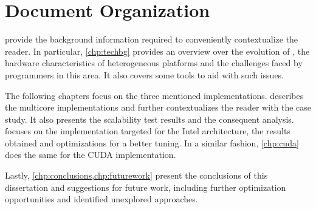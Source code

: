 \documentclass[../thesis]{subfiles}
\begin{document}
	\section{Document Organization}
	 provide the background information required to conveniently contextualize the reader. In particular, \cref{chp:techbg} provides an overview over the evolution of \hpc, the hardware characteristics of heterogeneous platforms and the challenges faced by programmers in this area. It also covers some tools to aid with such issues.

	The following chapters focus on the three mentioned implementations.  describes the multicore implementations and further contextualizes the reader with the case study. It also presents the scalability test results and the consequent analysis.  focuses on the implementation targeted	 for the Intel \mic architecture, the results obtained and optimizations for a better tuning. In a similar fashion, \cref{chp:cuda} does the same for the CUDA implementation.

	Lastly, \cref{chp:conclusions,chp:futurework} present the conclusions of this dissertation and suggestions for future work, including further optimization opportunities and identified unexplored approaches.	
\end{document}
